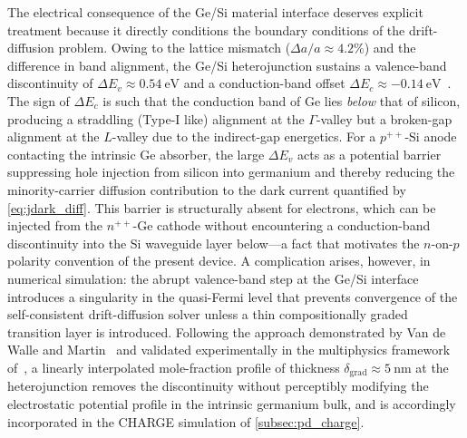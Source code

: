 The electrical consequence of the Ge/Si material interface deserves explicit
treatment because it directly conditions the boundary conditions of the
drift-diffusion problem. Owing to the lattice mismatch ($\Delta a/a \approx
4.2\%$) and the difference in band alignment, the Ge/Si heterojunction
sustains a valence-band discontinuity of $\Delta E_v \approx \SI{0.54}
{\electronvolt}$ and a conduction-band offset $\Delta E_c \approx \SI{-0.14}
{\electronvolt}$~\cite{Alasio2024,Basu2003}. The sign of $\Delta E_c$ is such
that the conduction band of Ge lies \emph{below} that of silicon, producing a
straddling (Type-I like) alignment at the $\Gamma$-valley but a broken-gap
alignment at the $L$-valley due to the indirect-gap energetics. For a
$p^{++}$-Si anode contacting the intrinsic Ge absorber, the large $\Delta E_v$
acts as a potential barrier suppressing hole injection from silicon into
germanium and thereby reducing the minority-carrier diffusion contribution to
the dark current quantified by \cref{eq:jdark_diff}. This barrier is
structurally absent for electrons, which can be injected from the $n^{++}$-Ge
cathode without encountering a conduction-band discontinuity into the Si
waveguide layer below—a fact that motivates the $n$-on-$p$ polarity convention
of the present device. A complication arises, however, in numerical simulation:
the abrupt valence-band step at the Ge/Si interface introduces a singularity in
the quasi-Fermi level that prevents convergence of the self-consistent
drift-diffusion solver unless a thin compositionally graded transition layer is
introduced. Following the approach demonstrated by Van de Walle and
Martin~\cite{Alasio2024} and validated experimentally in the multiphysics
framework of~\cite{Alasio2024}, a linearly interpolated mole-fraction profile
of thickness $\delta_{\mathrm{grad}} \approx \SI{5}{\nano\metre}$ at the
heterojunction removes the discontinuity without perceptibly modifying the
electrostatic potential profile in the intrinsic germanium bulk, and is
accordingly incorporated in the CHARGE simulation of \cref{subsec:pd_charge}.




